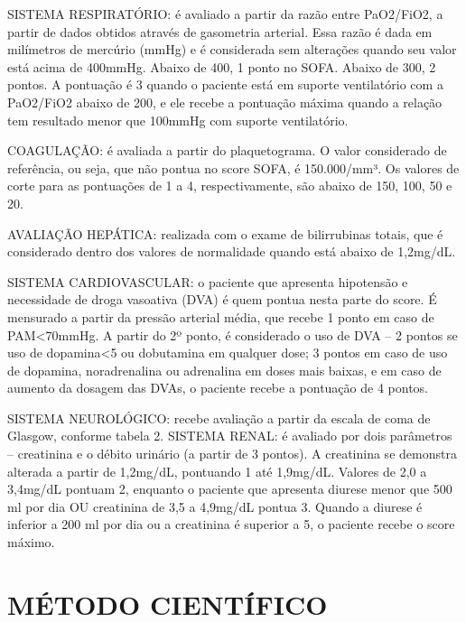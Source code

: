 \documentclass[12pt]{article}
\begin{document}
SISTEMA RESPIRATÓRIO: é avaliado a partir da razão entre PaO2/FiO2, a partir de dados obtidos através de gasometria arterial. Essa razão é dada em milímetros de mercúrio (mmHg) e é considerada sem alterações quando seu valor está acima de 400mmHg. Abaixo de 400, 1 ponto no SOFA. Abaixo de 300, 2 pontos. A pontuação é 3 quando o paciente está em suporte ventilatório com a PaO2/FiO2 abaixo de 200, e ele recebe a pontuação máxima quando a relação tem resultado menor que 100mmHg com suporte ventilatório.

COAGULAÇÃO: é avaliada a partir do plaquetograma. O valor considerado de referência, ou seja, que não pontua no score SOFA, é 150.000/mm³. Os valores de corte para as pontuações de 1 a 4, respectivamente, são abaixo de 150, 100, 50 e 20. 

AVALIAÇÃO HEPÁTICA: realizada com o exame de bilirrubinas totais, que é considerado dentro dos valores de normalidade quando está abaixo de 1,2mg/dL.

SISTEMA CARDIOVASCULAR: o paciente que apresenta hipotensão e necessidade de droga vasoativa (DVA) é quem pontua nesta parte do score. É mensurado a partir da pressão arterial média, que recebe 1 ponto em caso de PAM<70mmHg. A partir do 2º ponto, é considerado o uso de DVA – 2 pontos se uso de dopamina<5 ou dobutamina em qualquer dose;  3 pontos em caso de uso de dopamina, noradrenalina ou adrenalina em doses mais baixas, e em caso de aumento da dosagem das DVAs, o paciente recebe a pontuação de 4 pontos.

SISTEMA NEUROLÓGICO: recebe avaliação a partir da escala de coma de Glasgow, conforme tabela 2. 
SISTEMA RENAL: é avaliado por dois parâmetros – creatinina e o débito urinário (a partir de 3 pontos). A creatinina se demonstra alterada a partir de 1,2mg/dL, pontuando 1 até 1,9mg/dL. Valores de 2,0 a 3,4mg/dL pontuam 2, enquanto o paciente que apresenta diurese menor que 500 ml por dia OU creatinina de 3,5 a 4,9mg/dL pontua 3. Quando a diurese é inferior a 200 ml por dia ou a creatinina é superior a 5, o paciente recebe o score máximo. 



\section{MÉTODO CIENTÍFICO}
\end{document}
